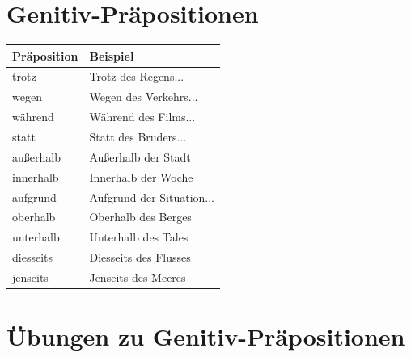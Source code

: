\section{Genitiv-Präpositionen}
\label{sec:GenitivPraep}

\begin{center}
\begin{tabular}{|l|l|}
\hline
\textbf{Präposition} & \textbf{Beispiel} \\ \hline
trotz & Trotz des Regens... \\ \hline
wegen & Wegen des Verkehrs... \\ \hline
während & Während des Films... \\ \hline
statt & Statt des Bruders... \\ \hline
außerhalb & Außerhalb der Stadt \\ \hline
innerhalb & Innerhalb der Woche \\ \hline
aufgrund & Aufgrund der Situation... \\ \hline
oberhalb & Oberhalb des Berges \\ \hline
unterhalb & Unterhalb des Tales \\ \hline
diesseits & Diesseits des Flusses \\ \hline
jenseits & Jenseits des Meeres \\ \hline
\end{tabular}
\end{center}

\section{Übungen zu Genitiv-Präpositionen}
\label{sec:GenitivPraepUebungen}

